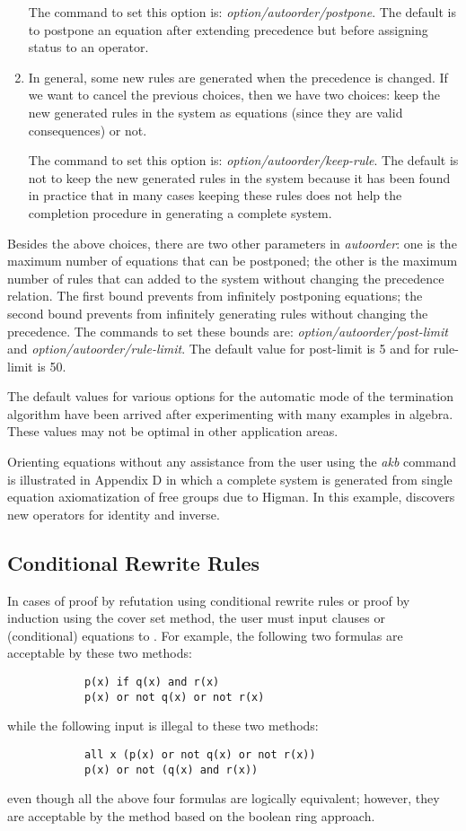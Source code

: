 \begin{enumerate}
The command to set this option is: {\em option/autoorder/postpone}.
The default is to postpone an equation after extending precedence but before
assigning status to an operator.
\item In general, some new rules are
generated when the precedence is
changed. If we want to cancel the previous choices, then we have two choices:
keep the new generated rules in the system as 
equations (since they are valid consequences) or not.

The command to set this option is: {\em option/autoorder/keep-rule}.
The default is not to keep the new generated rules in the system because
it has been found in practice that in many cases keeping
these rules does not help the completion procedure in generating
a complete system.
\end{enumerate}
  
Besides the above choices, there are two other parameters in {\em autoorder}: 
one is the maximum number of equations that can be postponed; the other is
the maximum number of rules that can added to the system without
changing the precedence relation. The first bound prevents \RRL from
infinitely postponing equations; the second bound prevents \RRL from
infinitely generating rules without changing the precedence.
The commands to set these bounds are: {\em
option/autoorder/post-limit} and {\em option/autoorder/rule-limit}.
The default value for post-limit is 5 and for rule-limit is 50.

The default values for various options for the automatic mode of the
termination algorithm have been arrived after experimenting with many
examples in algebra. These values may not be optimal in other
application areas.
  
Orienting equations without any assistance from the user using the
{\em akb} command is illustrated in Appendix D in which a complete
system is generated from single equation axiomatization of free groups
due to Higman. In this example, \RRL discovers new operators for
identity and inverse.

\subsection{Conditional Rewrite Rules \label{condi}}  

In cases of proof by refutation using conditional rewrite rules 
or proof by induction using the cover set method, the user must
input clauses or (conditional) equations to \ERRL. For example,
the following two formulas are acceptable by these 
two methods:
\begin{verbatim}
            p(x) if q(x) and r(x)
            p(x) or not q(x) or not r(x)
\end{verbatim}
while the following input is illegal to these two methods:
\begin{verbatim}
            all x (p(x) or not q(x) or not r(x))
            p(x) or not (q(x) and r(x))
\end{verbatim}
even though all the above four formulas are logically equivalent; however, 
they are acceptable by the method based on the boolean ring approach.

